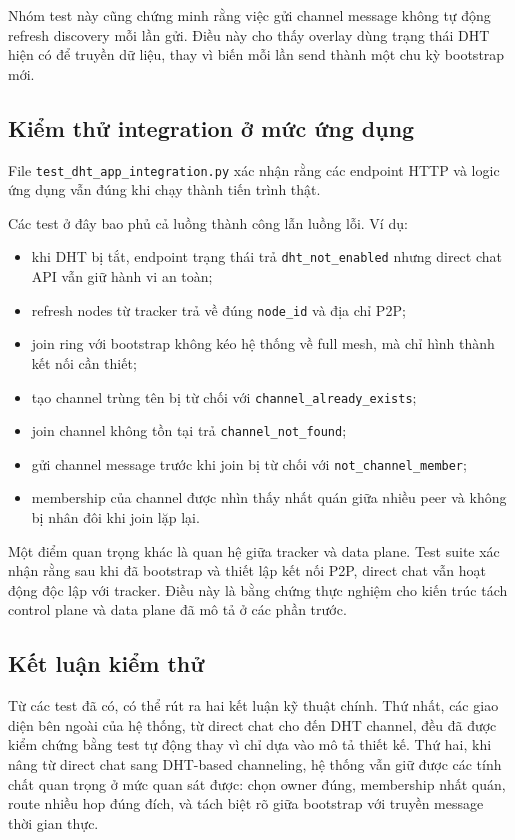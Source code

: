 Nhóm test này cũng chứng minh rằng việc gửi channel message không tự động refresh discovery mỗi lần gửi. Điều này cho thấy overlay dùng trạng thái DHT hiện có để truyền dữ liệu, thay vì biến mỗi lần send thành một chu kỳ bootstrap mới.

\subsection{Kiểm thử integration ở mức ứng dụng}
File \texttt{test\_dht\_app\_integration.py} xác nhận rằng các endpoint HTTP và logic ứng dụng vẫn đúng khi chạy thành tiến trình thật.

Các test ở đây bao phủ cả luồng thành công lẫn luồng lỗi. Ví dụ:
\begin{itemize}[leftmargin=2em]
    \item khi DHT bị tắt, endpoint trạng thái trả \texttt{dht\_not\_enabled} nhưng direct chat API vẫn giữ hành vi an toàn;
    \item refresh nodes từ tracker trả về đúng \texttt{node\_id} và địa chỉ P2P;
    \item join ring với bootstrap không kéo hệ thống về full mesh, mà chỉ hình thành kết nối cần thiết;
    \item tạo channel trùng tên bị từ chối với \texttt{channel\_already\_exists};
    \item join channel không tồn tại trả \texttt{channel\_not\_found};
    \item gửi channel message trước khi join bị từ chối với \texttt{not\_channel\_member};
    \item membership của channel được nhìn thấy nhất quán giữa nhiều peer và không bị nhân đôi khi join lặp lại.
\end{itemize}

Một điểm quan trọng khác là quan hệ giữa tracker và data plane. Test suite xác nhận rằng sau khi đã bootstrap và thiết lập kết nối P2P, direct chat vẫn hoạt động độc lập với tracker. Điều này là bằng chứng thực nghiệm cho kiến trúc tách control plane và data plane đã mô tả ở các phần trước.

\subsection{Kết luận kiểm thử}
Từ các test đã có, có thể rút ra hai kết luận kỹ thuật chính. Thứ nhất, các giao diện bên ngoài của hệ thống, từ direct chat cho đến DHT channel, đều đã được kiểm chứng bằng test tự động thay vì chỉ dựa vào mô tả thiết kế. Thứ hai, khi nâng từ direct chat sang DHT-based channeling, hệ thống vẫn giữ được các tính chất quan trọng ở mức quan sát được: chọn owner đúng, membership nhất quán, route nhiều hop đúng đích, và tách biệt rõ giữa bootstrap với truyền message thời gian thực.
